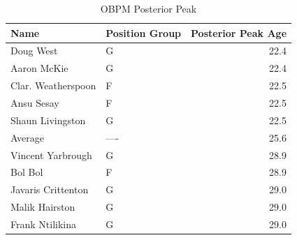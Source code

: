 \begin{table}[t]
\caption*{
{\large OBPM Posterior Peak}
} 
\fontsize{12.0pt}{14.4pt}\selectfont
\begin{tabular*}{\linewidth}{@{\extracolsep{\fill}}llr}
\toprule
Name & Position Group & Posterior Peak Age \\ 
\midrule\addlinespace[2.5pt]
Doug West & G & 22.4 \\ 
Aaron McKie & G & 22.4 \\ 
Clar. Weatherspoon & F & 22.5 \\ 
Ansu Sesay & F & 22.5 \\ 
Shaun Livingston & G & 22.5 \\ 
Average & ---- & 25.6 \\ 
Vincent Yarbrough & G & 28.9 \\ 
Bol Bol & F & 28.9 \\ 
Javaris Crittenton & G & 29.0 \\ 
Malik Hairston & G & 29.0 \\ 
Frank Ntilikina & G & 29.0 \\ 
\bottomrule
\end{tabular*}
\end{table}

